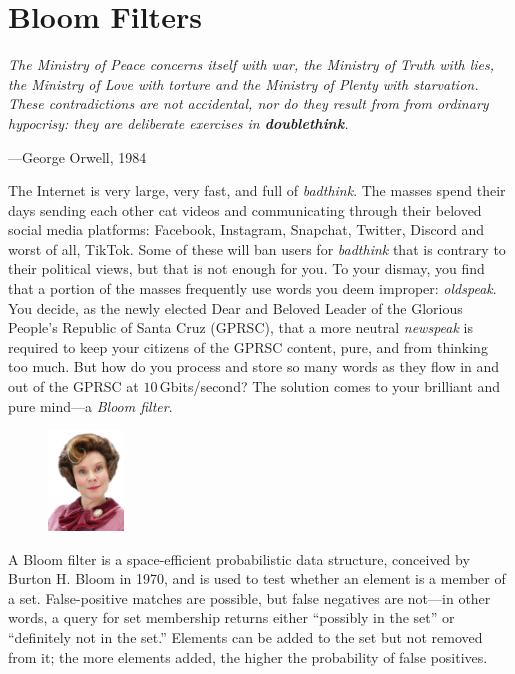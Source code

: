 \section{Bloom Filters}

\textwidth
\epigraph{\emph{The Ministry of Peace concerns itself with war, the Ministry
of Truth with lies, the Ministry of Love with torture and the Ministry of
Plenty with starvation. These contradictions are not accidental, nor do they
result from from ordinary hypocrisy: they are deliberate exercises in
\textbf{doublethink}.}}{---George Orwell, 1984}

\noindent The Internet is very large, very fast, and full of
\emph{badthink}. The masses spend their days sending each other cat
videos and communicating through their beloved social media platforms:
Facebook, Instagram, Snapchat, Twitter, Discord and worst of all,
TikTok. Some of these will ban users for \emph{badthink} that is
contrary to their political views, but that is not enough for you. To
your dismay, you find that a portion of the masses frequently use words
you deem improper: \emph{oldspeak}. You decide, as the newly elected
Dear and Beloved Leader of the Glorious People's Republic of Santa Cruz
(GPRSC), that a more neutral \emph{newspeak} is required to keep your
citizens of the GPRSC content, pure, and from thinking too much. But how
do you process and store so many words as they flow in and out of the
GPRSC at $10\,$Gbits/second? The solution comes to your brilliant and
pure mind---a \emph{Bloom filter}.

\begin{figure}
\centering
        \includegraphics[width=0.18\textwidth]{images/umbrudge.png}
\end{figure}

A Bloom filter is a space-efficient probabilistic data structure,
conceived by Burton H. Bloom in 1970, and is used to test whether an
element is a member of a set. False-positive matches are possible, but
false negatives are not---in other words, a query for set membership
returns either ``possibly in the set'' or ``definitely not in the set.''
Elements can be added to the set but not removed from it; the more
elements added, the higher the probability of false positives.

